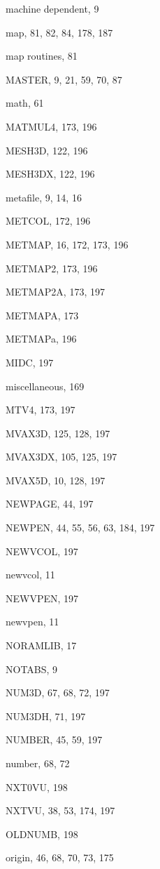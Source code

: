 \begin{theindex}
  \item machine dependent, 9
  \item map, 81, 82, 84, 178, 187
  \item map routines, 81
  \item MASTER, 9, 21, 59, 70, 87
  \item math, 61
  \item MATMUL4, 173, 196
  \item MESH3D, 122, 196
  \item MESH3DX, 122, 196
  \item metafile, 9, 14, 16
  \item METCOL, 172, 196
  \item METMAP, 16, 172, 173, 196
  \item METMAP2, 173, 196
  \item METMAP2A, 173, 197
  \item METMAPA, 173
  \item METMAPa, 196
  \item MIDC, 197
  \item miscellaneous, 169
  \item MTV4, 173, 197
  \item MVAX3D, 125, 128, 197
  \item MVAX3DX, 105, 125, 197
  \item MVAX5D, 10, 128, 197

  \indexspace

  \item NEWPAGE, 44, 197
  \item NEWPEN, 44, 55, 56, 63, 184, 197
  \item NEWVCOL, 197
  \item newvcol, 11
  \item NEWVPEN, 197
  \item newvpen, 11
  \item NORAMLIB, 17
  \item NOTABS, 9
  \item NUM3D, 67, 68, 72, 197
  \item NUM3DH, 71, 197
  \item NUMBER, 45, 59, 197
  \item number, 68, 72
  \item NXT0VU, 198
  \item NXTVU, 38, 53, 174, 197

  \indexspace

  \item OLDNUMB, 198
  \item origin, 46, 68, 70, 73, 175


\end{theindex}
